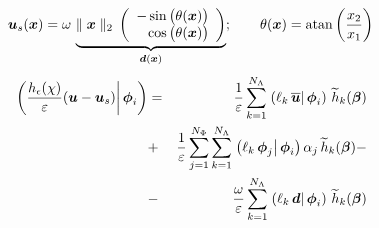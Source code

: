 \documentclass[10pt,a4paper]{article}
\begin{document}
%
%
\begin{equation}
\label{eq:us}
\boldsymbol{u}_s(\boldsymbol{x}) 
= 
\omega\, \underbrace{\parallel \boldsymbol{x} \parallel_2\,
\left(
\begin{array}{r}
-\sin\big(\theta(\boldsymbol{x})\big) \\
 \cos\big(\theta(\boldsymbol{x})\big)
\end{array}
\right)}_{\boldsymbol{d} (\boldsymbol{x})} ; \qquad \theta(\boldsymbol{x}) = \operatorname{atan}\left( \frac{x_2}{x_1}\right)
\end{equation}
%
\begin{eqnarray}
\label{eq:penalite_phii}
\left.\left(\frac{h_{\epsilon}(\chi)}{\varepsilon}(\boldsymbol{u}-\boldsymbol{u}_{s})\right\vert \boldsymbol{\phi}_i\right)&=&\frac{1}{\varepsilon} \sum_{k=1}^{N_{\Lambda}}\left.\left(\ell_k\,\overline{\boldsymbol{u}}\right\vert \boldsymbol{\phi}_i\right) \,\widetilde{h}_k (\boldsymbol{\beta})  \\ 
&+& \frac{1}{\varepsilon} \sum_{j=1}^{N_\Phi}\sum_{k=1}^{N_{\Lambda}}\left.\left(\ell_k\,\boldsymbol{\phi}_j\right\vert \boldsymbol{\phi}_i\right) \alpha_j\,\widetilde{h}_k (\boldsymbol{\beta}) - \\
&-& \frac{\omega}{\varepsilon} \sum_{k=1}^{N_{\Lambda}}\left.\left(\ell_k\,\boldsymbol{d}\right\vert \boldsymbol{\phi}_i\right) \,\widetilde{h}_k (\boldsymbol{\beta}) 
\end{eqnarray}
%
%
%
\newpage
\end{document}
